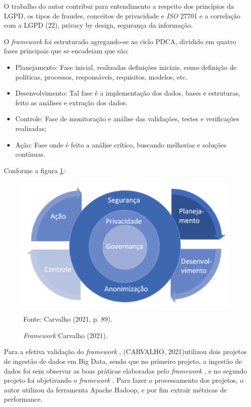 \documentclass[
	12pt,				%
	openright,			%
	oneside,			%
	a4paper,			%
	english,			%
	french,				%
	spanish,			%
	brazil,				%
	]{abntex2}
\begin{document}
O trabalho do autor contribui para entendimento a respeito dos princípios da LGPD, os tipos de fraudes, conceitos de privacidade e \textit{ISO} 27701 e a correlação com a LGPD (22), privacy by design, segurança da informação.

O \textit{framework}  foi estruturado agregando-se ao ciclo PDCA, dividido em quatro fases principais que se encadeiam que são:

\begin{itemize}
\item Planejamento: Fase inicial, realizadas definições iniciais, como definição de políticas, processos, responsáveis, requisitos, modelos, etc.
\item Desenvolvimento: Tal fase é a implementação dos dados, bases e estruturas, feito as análises e extração dos dados.
\item Controle: Fase de monitoração e análise das validações, testes e verificações realizadas;
\item Ação: Fase onde é feito a análise crítico, buscando melhorias e soluções contínuas.
\end{itemize}

Conforme a figura \ref{fig: Carvalho }:

\begin{figure}[ht]
    \centering
    \caption{\textit{Framework} Carvalho (2021).}
    \includegraphics[width=5.0in]{Images/08Carvalho2021.png}
    \label{fig: Carvalho }
    
    \centering \small Fonte: Carvalho (2021, p. 89).
\end{figure}

Para a efetiva validação do \textit{framework} , (CARVALHO, 2021)utilizou dois projetos de ingestão de dados em Big Data, sendo que no primeiro projeto, a ingestão de dados foi sem observar as boas práticas elaboradas pelo \textit{framework} , e no segundo projeto foi objetivando o \textit{framework} . Para fazer o processamento dos projetos, o autor utilizou da ferramenta Apache Hadoop, e por fim extrair métricas de performance.
\end{document}
